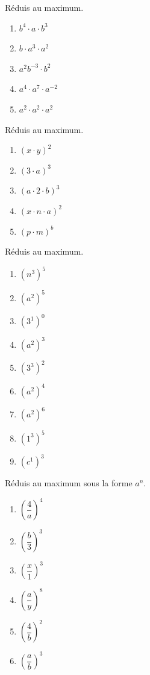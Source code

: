 \documentclass[12pt,parskip=half-, twoside=semi]{scrartcl}
\begin{document}
\setcounter{exercise}{0}

\begin{exercise}
  Réduis au maximum.
  \begin{enumerate}[cols=5]
    \item \(b^{4} \cdot a \cdot b^{3}\)
    \item \(b \cdot a^{3} \cdot a^{2}\)
    \item \(a^{2}b^{-3} \cdot b^{2}\)
    \item \(a^{4} \cdot a^{7} \cdot a^{-2}\)
    \item \(a^{2} \cdot a^{2} \cdot a^{2}\)
  \end{enumerate}
\end{exercise}

\begin{exercise}
  Réduis au maximum.
  \begin{enumerate}[cols=5]
    \item \((x \cdot y)^{2} \)
    \item \((3 \cdot a)^{3} \)
    \item \((a \cdot 2 \cdot b)^{3} \)
    \item \((x \cdot n \cdot a)^{2} \)
    \item \((p \cdot m)^{b} \)
  \end{enumerate}
\end{exercise}

\begin{exercise}
  Réduis au maximum.
  \begin{enumerate}[cols=6]
    \item \(\left( n^{3} \right)^{5}\)
    \item \(\left( a^{2} \right)^{5}\)
    \item \(\left( 3^{1} \right)^{0}\)
    \item \(\left( a^{2} \right)^{3}\)
    \item \(\left( 3^{3} \right)^{2}\)
    \item \(\left( a^{2} \right)^{4}\)
    \item \(\left( a^{2} \right)^{6}\)
    \item \(\left( 1^{3} \right)^{5}\)
    \item \(\left( c^{1} \right)^{3}\)
  \end{enumerate}
\end{exercise}

\begin{exercise}
  Réduis au maximum sous la forme $a^n$.
  \begin{enumerate}[cols=6]
    \item \(\left( \dfrac{4}{a} \right)^{4}\)
    \item \(\left( \dfrac{b}{3} \right)^{3}\)
    \item \(\left( \dfrac{x}{1} \right)^{3}\)
    \item \(\left( \dfrac{a}{y} \right)^{8}\)
    \item \(\left( \dfrac{4}{b} \right)^{2}\)
    \item \(\left( \dfrac{a}{b} \right)^{3}\)
  \end{enumerate}
\end{exercise}
\end{document}
